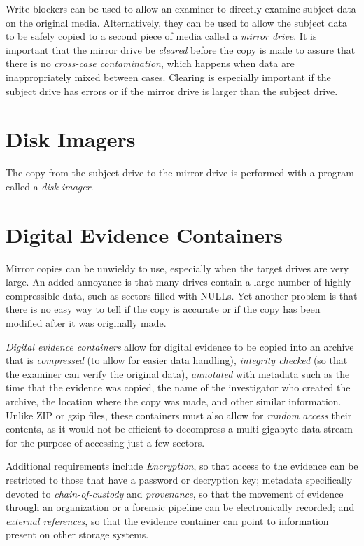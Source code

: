 \documentclass[11pt,letter]{article}
\begin{document}
Write blockers can be used to allow an examiner to directly examine
subject data on the original media. Alternatively, they can be used to allow the subject
data to be safely copied to a second piece of media called a
\emph{mirror drive}. It is important that the mirror drive be
\emph{cleared} before the copy is made to assure that there is no
\emph{cross-case contamination}, which happens when data are
inappropriately mixed between cases. Clearing is especially important
if the subject drive has errors or if the mirror drive is larger than
the subject drive.

\section{Disk Imagers}
The copy from the subject drive to the mirror drive is performed with
a program called a \emph{disk imager}.

\section{Digital Evidence Containers}

Mirror copies can be unwieldy to use, especially when the target
drives are very large. An added annoyance is that many drives contain
a large number of highly compressible data, such as sectors filled
with NULLs. Yet another problem is that there is no easy way to tell
if the copy is accurate or if the copy has been modified after it was
originally made.

\emph{Digital evidence containers} allow for digital evidence to be
copied into an archive that is \emph{compressed} (to allow for easier
data handling), \emph{integrity checked} (so that the examiner can
verify the original data), \emph{annotated} with metadata such as the
time that the evidence was copied, the name of the investigator who
created the archive, the location where the copy was made, and other
similar information. Unlike ZIP or gzip files, these containers must
also allow for \emph{random access} their contents, as it would not be
efficient to decompress a multi-gigabyte data stream for the purpose
of accessing just a few sectors.

Additional requirements include \emph{Encryption}, so that access to
the evidence can be restricted to those that have a password or
decryption key; metadata specifically devoted to
\emph{chain-of-custody} and \emph{provenance}, so that the movement of
evidence through an organization or a forensic pipeline can be
electronically recorded; and \emph{external references}, so that the
evidence container can point to information present on other storage
systems.
\end{document}
